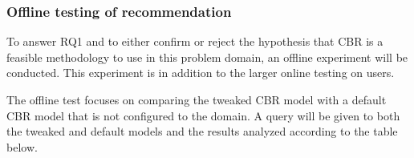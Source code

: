 \subsubsection{Offline testing of recommendation}

To answer RQ1 and to either confirm or reject the hypothesis that CBR is a feasible methodology to use in this problem domain, an offline experiment will be conducted. This experiment is in addition to the larger online testing on users. 

The offline test focuses on comparing the tweaked CBR model with a default CBR model that is not configured to the domain. A query will be given to both the tweaked and default models and the results analyzed according to the table below. 

\begin{table}[]
\centering
{}
\end{table}
